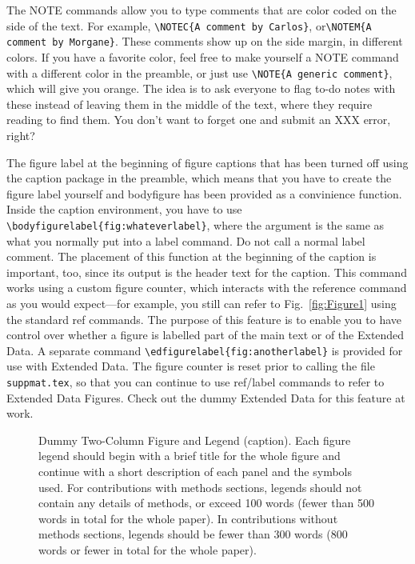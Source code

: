 The NOTE commands allow you to type comments that are color coded on the side of the text. For example, \verb!\NOTEC{A comment by Carlos}!, or\verb!\NOTEM{A comment by Morgane}!. These comments show up on the side margin, in different colors. If you have a favorite color, feel free to make yourself a NOTE command with a different color in the preamble, or just use \verb!\NOTE{A generic comment}!, which will give you orange. The idea is to ask everyone to flag to-do notes with these instead of leaving them in the middle of the text, where they require reading to find them. You don't want to forget one and submit an XXX error, right?

The figure label at the beginning of figure captions that has been turned off using the caption package in the preamble, which means that you have to create the figure label yourself and bodyfigure has been provided as a convinience function.  Inside the caption environment, you have to use \verb!\bodyfigurelabel{fig:whateverlabel}!, where the argument is the same as what you normally put into a label command. Do not call a normal label comment. The placement of this function at the beginning of the caption is important, too, since its output is the header text for the caption. This command works using a custom figure counter, which interacts with the reference command as you would expect---for example, you still can refer to Fig.~\ref{fig:Figure1} using the standard ref commands. The purpose of this feature is to enable you to have control over whether a figure is labelled part of the main text or of the Extended Data. A separate command \verb!\edfigurelabel{fig:anotherlabel}! is provided for use with Extended Data. The figure counter is reset prior to calling the file \verb!suppmat.tex!, so that you can continue to use ref/label commands to refer to Extended Data Figures. Check out the dummy Extended Data for this feature at work.


\begin{figure}
\centerline{}
\caption{ Dummy Two-Column Figure and Legend (caption). Each figure legend should begin with a brief title for the whole figure and continue with a short description of each panel and the symbols used. For contributions with methods sections, legends should not contain any details of methods, or exceed 100 words (fewer than 500 words in total for the whole paper). In contributions without methods sections, legends should be fewer than 300 words (800 words or fewer in total for the whole paper)\cite{gta}.}
\end{figure}


